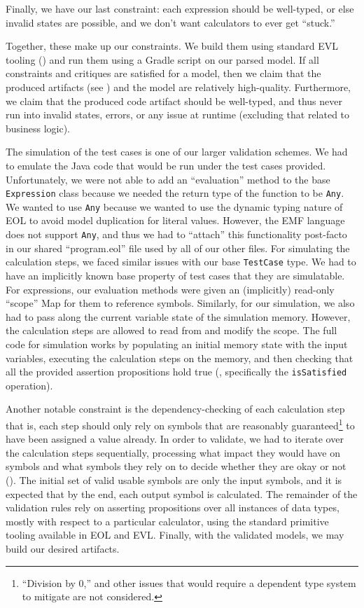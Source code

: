 \documentclass[11pt,fleqn]{article}
\begin{document}
Finally, we have our last constraint: each expression should be well-typed, or
else invalid states are possible, and we don't want calculators to ever get
``stuck.''

Together, these make up our constraints. We build them using standard EVL
tooling () and run them using a Gradle
script on our parsed model. If all constraints and critiques are satisfied for a
model, then we claim that the produced artifacts (see
) and the model are relatively
high-quality. Furthermore, we claim that the produced code artifact should be
well-typed, and thus never run into invalid states, errors, or any issue at
runtime (excluding that related to business logic).

The simulation of the test cases is one of our larger validation schemes. We had
to emulate the Java code that would be run under the test cases provided.
Unfortunately, we were not able to add an ``evaluation'' method to the base
\lstinline{Expression} class because we needed the return type of the function
to be \lstinline{Any}. We wanted to use \lstinline{Any} because we wanted to use
the dynamic typing nature of EOL to avoid model duplication for literal values.
However, the EMF language does not support \lstinline{Any}, and thus we had to
``attach'' this functionality post-facto in our shared ``program.eol'' file used
by all of our other files. For simulating the calculation steps, we faced
similar issues with our base \lstinline{TestCase} type. We had to have an
implicitly known base property of test cases that they are simulatable. For
expressions, our evaluation methods were given an (implicitly) read-only
``scope'' Map for them to reference symbols. Similarly, for our simulation, we
also had to pass along the current variable state of the simulation memory.
However, the calculation steps are allowed to read from and modify the scope.
The full code for simulation works by populating an initial memory state with
the input variables, executing the calculation steps on the memory, and then
checking that all the provided assertion propositions hold true
(, specifically the \lstinline{isSatisfied}
operation).

Another notable constraint is the dependency-checking of each calculation step
\textemdash{} that is, each step should only rely on symbols that are reasonably
guaranteed\footnote{``Division by 0,'' and other issues that would require a
dependent type system to mitigate are not considered.} to have been assigned a
value already. In order to validate, we had to iterate over the calculation
steps sequentially, processing what impact they would have on symbols and what
symbols they rely on to decide whether they are okay or not
(). The initial set of valid usable symbols
are only the input symbols, and it is expected that by the end, each output
symbol is calculated. The remainder of the validation rules rely on asserting
propositions over all instances of data types, mostly with respect to a
particular calculator, using the standard primitive tooling available in EOL and
EVL. Finally, with the validated models, we may build our desired artifacts.
\end{document}
